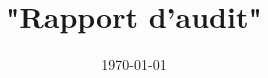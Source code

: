 \documentclass[12pt]{extarticle}
\begin{document}
\title{"Rapport d'audit"}
\date{\today}
\maketitle
\tableofcontents
\end{document}
